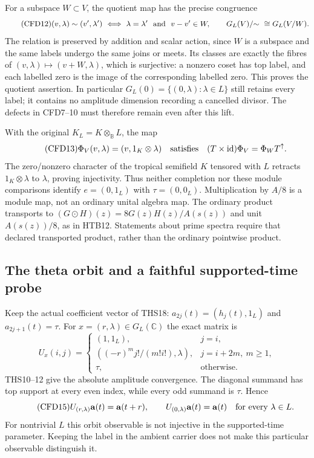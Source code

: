 For a subspace $W\subset V$, the quotient map has the precise
congruence
\begin{equation}\tag{CFD12}
 (v,\lambda)\sim(v',\lambda')
 \ \Longleftrightarrow\
 \lambda=\lambda'\ \hbox{ and }\ v-v'\in W,
 \qquad
 G_L(V)/{\sim}\ \cong G_L(V/W).
\end{equation}
The relation is preserved by addition and scalar action, since $W$
is a subspace and the same labels undergo the same joins or meets.
Its classes are exactly the fibres of $(v,\lambda)\mapsto
(v+W,\lambda)$, which is surjective: a nonzero coset has top label,
and each labelled zero is the image of the corresponding labelled
zero. This proves the quotient assertion. In particular
$G_L(0)=\{(0,\lambda):\lambda\in L\}$ still retains every label;
it contains no amplitude dimension recording a cancelled divisor.
The defects in CFD7--10 must therefore remain even after this lift.

With the original $K_L=K\otimes_{\mathbb B}L$, the map
\begin{equation}\tag{CFD13}
 \Phi_V(v,\lambda)=(v,1_K\otimes\lambda)
 \quad\hbox{satisfies}\quad
 (T\times\mathrm{id})\Phi_V=\Phi_W T^\uparrow.
\end{equation}
The zero/nonzero character of the tropical semifield $K$ tensored
with $L$ retracts $1_K\otimes\lambda$ to $\lambda$, proving
injectivity. Thus neither completion nor these module comparisons
identify $e=(0,1_L)$ with $\tau=(0,0_L)$. Multiplication by $A/8$
is a module map, not an ordinary unital algebra map. The ordinary
product transports to $(G\odot H)(z)=8G(z)H(z)/A(s(z))$ and unit
$A(s(z))/8$, as in HTB12. Statements about prime spectra require
that declared transported product, rather than the ordinary
pointwise product.

\subsection{The theta orbit and a faithful supported-time probe}

Keep the actual coefficient vector of THS18:
$a_{2j}(t)=(h_j(t),1_L)$ and $a_{2j+1}(t)=\tau$.
For $x=(r,\lambda)\in G_L(\mathbb C)$ the exact matrix is
\begin{equation}\tag{CFD14}
 U_x(i,j)=
 \begin{cases}
 (1,1_L),&j=i,\\
 ((-r)^m j!/(m!i!),\lambda),&j=i+2m,\ m\ge1,\\
 \tau,&\text{otherwise}.
 \end{cases}
\end{equation}
THS10--12 give the absolute amplitude convergence. The diagonal
summand has top support at every even index, while every odd
summand is $\tau$. Hence
\begin{equation}\tag{CFD15}
 U_{(r,\lambda)}\mathbf a(t)=\mathbf a(t+r),\qquad
 U_{(0,\lambda)}\mathbf a(t)=\mathbf a(t)
                    \quad\hbox{for every }\lambda\in L.
\end{equation}
For nontrivial $L$ this orbit observable is not injective in the
supported-time parameter. Keeping the label in the ambient carrier
does not make this particular observable distinguish it.

